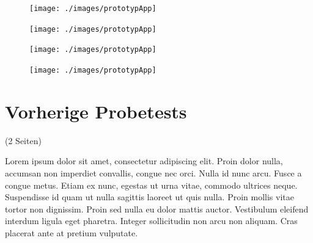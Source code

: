\begin{figure}
  \vspace{-20pt}
  \begin{center}
    \texttt{[image: ./images/prototypApp]}
  \end{center}
  \vspace{-40pt}
\end{figure}


\begin{figure}
  \vspace{-20pt}
  \begin{center}
    \texttt{[image: ./images/prototypApp]}
  \end{center}
  \vspace{-40pt}
\end{figure}


\begin{figure}
  \vspace{-20pt}
  \begin{center}
    \texttt{[image: ./images/prototypApp]}
  \end{center}
  \vspace{-40pt}
\end{figure}


\begin{figure}
  \vspace{-20pt}
  \begin{center}
    \texttt{[image: ./images/prototypApp]}
  \end{center}
  \vspace{-40pt}
\end{figure}


\clearpage
\section{Vorherige Probetests}
\label{sec:probetests}

(2 Seiten)

Lorem ipsum dolor sit amet, consectetur adipiscing elit. Proin dolor nulla, accumsan non imperdiet convallis, congue nec orci. Nulla id nunc arcu. Fusce a congue metus. Etiam ex nunc, egestas ut urna vitae, commodo ultrices neque. Suspendisse id quam ut nulla sagittis laoreet ut quis nulla. Proin mollis vitae tortor non dignissim. Proin sed nulla eu dolor mattis auctor. Vestibulum eleifend interdum ligula eget pharetra. Integer sollicitudin non arcu non aliquam. Cras placerat ante at pretium vulputate.

